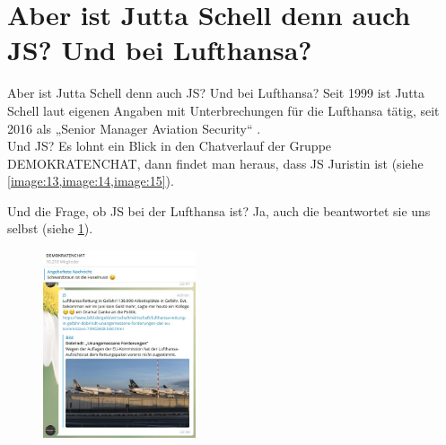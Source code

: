 \section{Aber ist Jutta Schell denn auch JS? Und bei Lufthansa?}
Aber ist Jutta Schell denn auch JS? Und bei Lufthansa?
Seit 1999 ist Jutta Schell laut eigenen Angaben mit Unterbrechungen für die Lufthansa tätig, seit 2016 als „Senior Manager Aviation Security“ \autocite{14}.\\

Und JS? Es lohnt ein Blick in den Chatverlauf der Gruppe DEMOKRATENCHAT, dann findet man heraus, dass JS Juristin ist (siehe \cref{image:13,image:14,image:15}).

\begin{figure}[hbt!]\centering
  \caption{}
\end{figure}

Und die Frage, ob JS bei der Lufthansa ist? Ja, auch die beantwortet
sie uns selbst (siehe \cref{image:16}).
\begin{figure}[hbt!]\centering
  \includegraphics[width=0.4\textwidth]{images/image--016.jpg}
  \caption{\autocite{18}}\label{image:16}
\end{figure}

